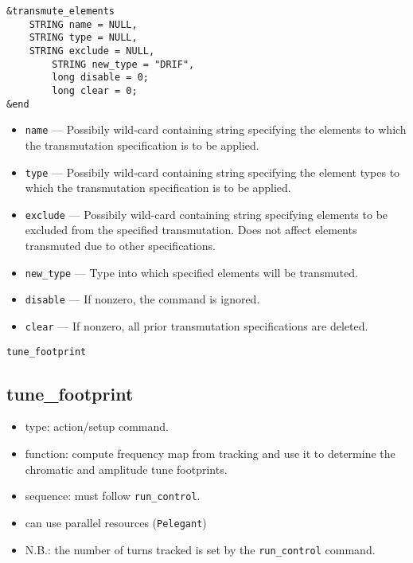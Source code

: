 \documentclass[11pt]{article}
\begin{document}
\begin{verbatim}
&transmute_elements
	STRING name = NULL,
	STRING type = NULL,
	STRING exclude = NULL,
        STRING new_type = "DRIF",
        long disable = 0;
        long clear = 0;
&end
\end{verbatim}

\begin{itemize}
\item \verb|name| --- Possibily wild-card containing string specifying the
	elements to which the transmutation specification is to be applied.
\item \verb|type| --- Possibily wild-card containing string specifying the
	element types to which the transmutation specification is to be applied.
\item \verb|exclude| --- Possibily wild-card containing string specifying 
	elements to be excluded from the specified transmutation.  Does not
	affect elements transmuted due to other specifications.
\item \verb|new_type| --- Type into which specified elements will be transmuted.
\item \verb|disable| --- If nonzero, the command is ignored.
\item \verb|clear| --- If nonzero, all prior transmutation specifications are deleted.
\end{itemize}

\newpage
\begin{center}{\Large\verb|tune_footprint|}\end{center}
\subsection{tune\_footprint \label{subsec:tunefootprint}}

\begin{itemize}
\item type: action/setup command.  
\item function: compute frequency map from tracking and use it to determine the 
  chromatic and amplitude tune footprints.
\item sequence: must follow \verb|run_control|.
\item can use parallel resources (\verb|Pelegant|)
\item N.B.: the number of turns tracked is set by the \verb|run_control| command.
\end{itemize}
\end{document}
